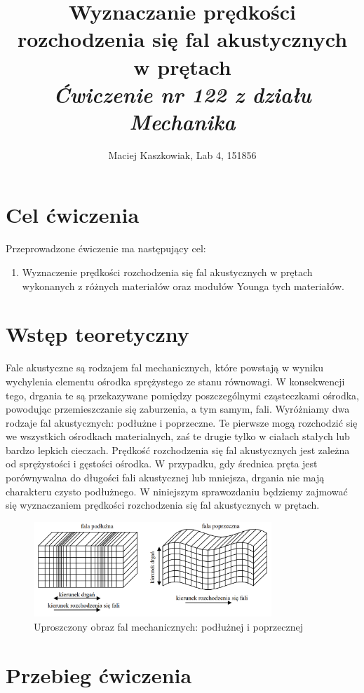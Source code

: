\documentclass[polish, a4paper]{article}
\title{Wyznaczanie prędkości rozchodzenia się fal akustycznych w prętach \\
        \Large \emph{Ćwiczenie nr 122 z działu Mechanika}}
\author{Maciej Kaszkowiak, Lab 4, 151856}
\date{\vspace{-5ex}} %
\begin{document}
\maketitle

\section{Cel ćwiczenia}
Przeprowadzone ćwiczenie ma następujący cel:
\begin{enumerate}
\item{Wyznaczenie prędkości rozchodzenia się fal akustycznych w prętach wykonanych z różnych
materiałów oraz modułów Younga tych materiałów. }
\end{enumerate}
\section{Wstęp teoretyczny}

Fale akustyczne są rodzajem fal mechanicznych, które powstają w wyniku wychylenia elementu ośrodka sprężystego ze stanu równowagi. W konsekwencji tego, drgania te są przekazywane pomiędzy poszczególnymi cząsteczkami ośrodka, powodując przemieszczanie się zaburzenia, a tym samym, fali. Wyróżniamy dwa rodzaje fal akustycznych: podłużne i poprzeczne. Te pierwsze mogą rozchodzić się we wszystkich ośrodkach materialnych, zaś te drugie tylko w ciałach stałych lub bardzo lepkich cieczach. Prędkość rozchodzenia się fal akustycznych jest zależna od sprężystości i gęstości ośrodka. W przypadku, gdy średnica pręta jest porównywalna do długości fali akustycznej lub mniejsza, drgania nie mają charakteru czysto podłużnego. W niniejszym sprawozdaniu będziemy zajmować się wyznaczaniem prędkości rozchodzenia się fal akustycznych w prętach.

\begin{figure}[H]
\centering
\includegraphics[width=0.8\textwidth]{fale.png}
\caption{Uproszczony obraz fal mechanicznych: podłużnej i poprzecznej}
\end{figure}

\section{Przebieg ćwiczenia}
\end{document}
